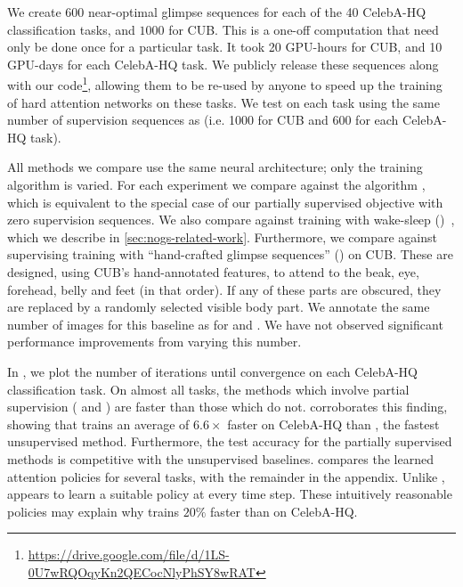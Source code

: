  We create $600$ near-optimal
glimpse sequences for each of the 40 CelebA-HQ classification tasks, and $1000$
for CUB. This is a one-off computation that need only be done once for a
particular task. It took 20 GPU-hours for CUB, and 10 GPU-days for each
CelebA-HQ task. We publicly release these sequences along with our
code\footnote{\url{https://drive.google.com/file/d/1LS-0U7wRQOqyKn2QECocNlyPhSY8wRAT}},
allowing them to be re-used by anyone to speed up the training of hard attention
networks on these tasks. We test \PSRAM{} on each task using the same number of
supervision sequences as \PSNOGS{} (i.e. 1000 for CUB and 600 for each CelebA-HQ
task).

 All methods we compare use the same neural
architecture; only the training algorithm is varied. For each experiment we
compare against the \RAM{} algorithm \cite{mnih2014recurrent}, which is
equivalent to the special case of our partially supervised objective with zero
supervision sequences.
%
We also compare against training with wake-sleep
(\WSRAM{})~\cite{ba2015learning}, which we describe in \cref{sec:nogs-related-work}.
Furthermore, we compare against supervising training with ``hand-crafted glimpse
sequences'' (\HGS{}) on CUB. These are designed, using CUB's hand-annotated
features, to attend to the beak, eye, forehead, belly and feet (in that order).
If any of these parts are obscured, they are replaced by a randomly selected
visible body part. We annotate the same number of images for this baseline as
for \PSRAM{} and \PSNOGS{}. We have not observed significant performance
improvements from varying this number.

 In , we
plot the number of iterations until convergence on each CelebA-HQ classification
task. On almost all tasks, the methods which involve partial supervision
(\PSRAM{} and \PSNOGS{}) are faster than those which do not. 
corroborates this finding, showing that \PSNOGS{} trains an average of
$6.6\times$ faster on CelebA-HQ than \RAM{}, the fastest unsupervised method.
Furthermore, the test accuracy for the partially supervised methods is
competitive with the unsupervised baselines.  compares the
learned attention policies for several tasks, with the remainder in the
appendix. Unlike \RAM{}, \PSNOGS{} appears to learn a suitable policy at every
time step. These intuitively reasonable policies may explain why \PSNOGS{}
trains $20\%$ faster than \PSRAM{} on CelebA-HQ.

